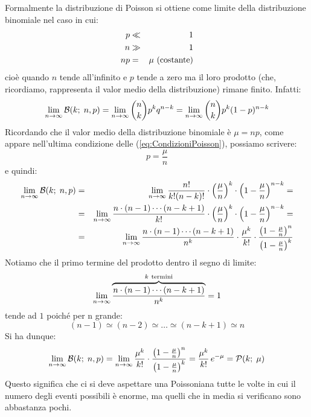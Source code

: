 Formalmente la distribuzione di Poisson si ottiene come limite della
distribuzione binomiale nel caso in cui:
\begin{eqnarray}\label{eq:CondizioniPoisson}
p & \ll & 1\\ \nonumber
n & \gg & 1\\ \nonumber
np & = & \mu {\rm~(costante)}
\end{eqnarray}
cio\`e quando $n$ tende all'infinito e $p$ tende a zero ma il loro prodotto
(che, ricordiamo, rappresenta il valor medio della distribuzione) rimane
finito. Infatti:
$$
\lim_{n \to \infty} {\cal B}(k; \; n, p) =
\lim_{n \to \infty} \binom{n}{k}p^k q^{n-k}=
\lim_{n \to \infty} \binom{n}{k}p^k (1 - p)^{n - k}
$$
Ricordando che il valor medio della distribuzione binomiale \`e $\mu = np$,
come appare nell'ultima condizione delle (\ref{eq:CondizioniPoisson}),
possiamo scrivere:
$$
p = \frac{\mu}{n}
$$
e quindi:
\begin{eqnarray*}
\lim_{n \to \infty} {\cal B}(k; \; n, p) & = &
\lim_{n \to \infty} \frac{n!}{k! (n - k)!} \cdot \left( \frac{\mu}{n} \right)^k
\cdot \left( 1 - \frac{\mu}{n} \right)^{n-k} =\\
& = & \lim_{n \to \infty} \frac{n \cdot (n - 1)
\cdots (n - k + 1)}{k!} \cdot \left( \frac{\mu}{n} \right)^k
\cdot \left( 1 - \frac{\mu}{n} \right)^{n-k} =\\
& = & \lim_{n \to \infty} \frac{n \cdot (n - 1)
\cdots (n - k + 1)}{n^k} \cdot
\frac{\mu^k}{k!} \cdot \frac{\left(1-\frac{\mu}{n}\right)^n}
{\left(1-\frac{\mu}{n}\right)^k}
\end{eqnarray*}
Notiamo che il primo termine del prodotto dentro il segno di limite:
$$
\lim_{n \to \infty} \overbrace{\frac{n \cdot (n - 1)
\cdots (n - k + 1)}{n^k}}^{k {\rm~termini}} = 1
$$
tende ad $1$ poich\'e per n grande:
$$
(n - 1) \simeq (n - 2) \simeq \ldots \simeq (n - k + 1) \simeq n
$$
Si ha dunque:
$$
\lim_{n \to \infty} {\cal B}(k; \; n, p) =
\lim_{n \to \infty} \frac{\mu^k}{k!} \cdot
\frac{\left(1-\frac{\mu}{n}\right)^n} {\left(1-\frac{\mu}{n}\right)^k} =
\frac{\mu^k}{k!}\,e^{-\mu} = {\cal P}(k; \; \mu)
$$
Questo significa che ci si deve aspettare una Poissoniana tutte le volte in
cui il numero degli eventi possibili \`e enorme, ma quelli che in media si
verificano sono abbastanza pochi.

